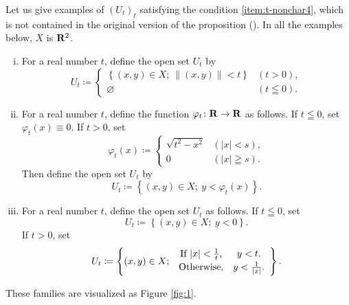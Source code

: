 \begin{Example+}
  Let us give examples of \(\left(U_{t}\right)_{t}\) 
  satisfying the condition \ref{item:t-nonchar4}, 
  which is not contained in the original version 
  of the proposition (\cite[Proposition 2.7.2]{KS90}). 
  In all the examples below, \(X\) is \(\mathbf{R}^{2}\). 
  \begin{enumerate}[(i)]
    \item For a real number \(t\), 
    define the open set \(U_{t}\) by \[
      U_{t}\coloneqq
      \begin{cases}
      \left\{(x,y)\in X;\ \left\|(x,y)\right\|<t\right\}&(t>0),\\
      \varnothing&(t\leqq0).         
      \end{cases}
    \]
    \item For a real number \(t\), 
    define the function \(\varphi_{t}\colon \mathbf{R}\to \mathbf{R}\) as follows.
    If \(t\leqq 0\), set \(\varphi_{t}(x)\equiv 0\). 
    If \(t> 0\), set \[
      \varphi_{t}(x)\coloneqq\begin{cases}
        \sqrt{t^{2}-x^{2}} & (\left|x\right|<s),\\
        0&(\left|x\right|\geqq s).
      \end{cases}
    \]
    Then define the open set \(U_{t}\) by \[
      U_{t}\coloneqq
      \left\{(x,y)\in X;\ y<\varphi_{t}(x)\right\}. 
    \]
    \item For a real number \(t\), 
    define the open set \(U_{t}\) as follows. 
    If \(t\leqq0\), set \[
      U_{t}\coloneqq
      \left\{(x,y)\in X;\ y<0\right\}. 
    \]
    If \(t>0\), set \[
      U_{t}\coloneqq
      \left\{(x,y)\in X;\ 
        \begin{array}{cc}
          \text{If \(\left|x\right|<\tfrac{1}{t}\),}&y<t.\vspace{2pt}\\
          \text{Otherwise,}&y<\tfrac{1}{\left|x\right|}.
        \end{array}
      \right\}. 
    \]
  \end{enumerate}
  These families are visualized as Figure \ref{fig:1}.
  \begin{figure}
    \centering
    \begin{minipage}[b]{0.32\columnwidth}
      \centering
\end{minipage}
\end{figure}
\end{Example+}
